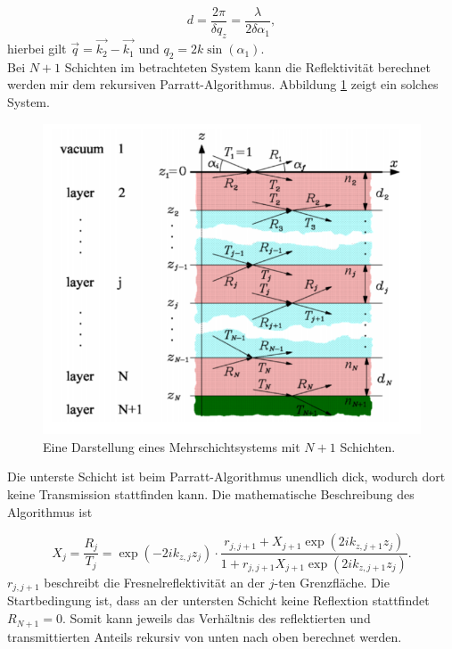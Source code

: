 \begin{equation*}
    \label{eqn:Kiessig}
    d = \frac{2\pi}{\delta q_z} = \frac{\lambda}{2\delta\alpha_1},
\end{equation*}
hierbei gilt $\vec{q} = \vec{k_2}-\vec{k_1}$ und $q_2 = 2k\sin{\left(\alpha_1\right)}$.\\
\noindent
Bei $N+1$ Schichten im betrachteten System kann die Reflektivität berechnet werden mir dem rekursiven Parratt-Algorithmus.
Abbildung \ref{fig:ns} zeigt ein solches System.

\begin{figure}
    \centering
    \includegraphics[scale=0.6]{figures/Zwei.png}
    \caption{Eine Darstellung eines Mehrschichtsystems mit $N+1$ Schichten.\cite{Pynn}}
    \label{fig:ns}
  \end{figure}
\noindent
Die unterste Schicht ist beim Parratt-Algorithmus unendlich dick, wodurch dort keine Transmission stattfinden kann.
Die mathematische Beschreibung des Algorithmus ist

\begin{equation*}
    \label{eqn:parrat_1}
    X_j = \frac{R_j}{T_j} = \exp{\left(-2ik_{z,j}z_j\right)}\cdot \frac{r_{j,j+1}+X_{j+1}\exp{\left(2ik_{z,j+1}z_j\right)}}{1+r_{j,j+1}X_{j+1}\exp{\left(2ik_{z,j+1}z_j\right)}}.
\end{equation*}
\noindent
$r_{j,j+1}$ beschreibt die Fresnelreflektivität an der $j$-ten Grenzfläche.
Die Startbedingung ist, dass an der untersten Schicht keine Reflextion stattfindet $R_{N+1} = 0$. Somit kann jeweils
das Verhältnis des reflektierten und transmittierten Anteils rekursiv von unten nach oben berechnet werden.

